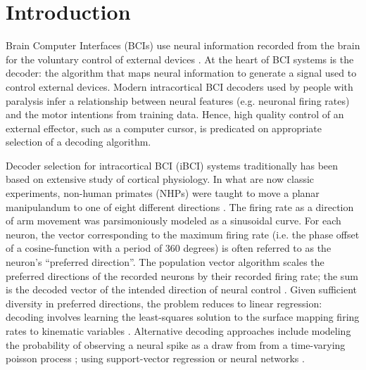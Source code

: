 \section{Introduction}

Brain Computer Interfaces (BCIs) use neural information recorded from the brain for the voluntary control of external devices \cite{Wolpaw2002, Hochberg2006, Schwartz2006, Lebedev2006, Fetz2007, Chestek2009, Carmena2013}. At the heart of BCI systems is the decoder: the algorithm that maps neural information to generate a signal used to control external devices. Modern intracortical BCI decoders used by people with paralysis infer a relationship between neural features (e.g. neuronal firing rates) and the motor intentions from training data. Hence, high quality control of an external effector, such as a computer cursor, is predicated on appropriate selection of a decoding algorithm. 

Decoder selection for intracortical BCI (iBCI) systems traditionally has been based on extensive study of cortical physiology. In what are now classic experiments, non-human primates (NHPs) were taught to move a planar manipulandum to one of eight different directions \cite{Georgopoulos1982}. The firing rate as a direction of arm movement was parsimoniously modeled as a sinusoidal curve. For each neuron, the vector corresponding to the maximum firing rate (i.e. the phase offset of a cosine-function with a period of 360 degrees) is often referred to as the neuron's ``preferred direction''. The population vector algorithm scales the preferred directions of the recorded neurons by their recorded firing rate; the sum is the decoded vector of the intended direction of neural control \cite{Taylor2002, Jarosiewicz2008, Velliste2008}. Given sufficient diversity in preferred directions, the problem reduces to linear regression: decoding involves learning the least-squares solution to the surface mapping firing rates to kinematic variables \cite{Kass2005}. Alternative decoding approaches include modeling the probability of observing a neural spike as a draw from from a time-varying poisson process \cite{Truccolo2008, Brown2002, Ba2014, Shanechi2017}; using support-vector regression \cite{Shpigelman2008} or neural networks \cite{Sussillo2016a}.

